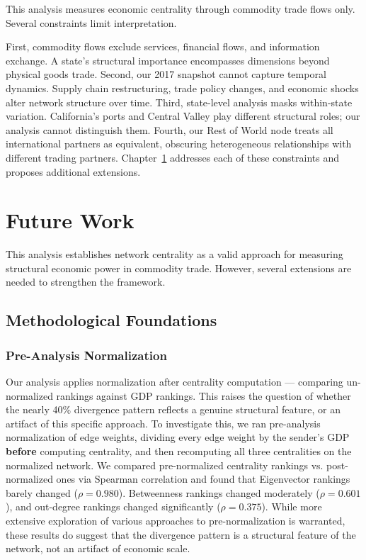 \documentclass[12pt,oneside]{book}
\begin{document}
This analysis measures economic centrality through commodity trade flows only. Several constraints limit interpretation.

First, commodity flows exclude services, financial flows, and information exchange. A state's structural importance encompasses dimensions beyond physical goods trade. Second, our 2017 snapshot cannot capture temporal dynamics. Supply chain restructuring, trade policy changes, and economic shocks alter network structure over time. Third, state-level analysis masks within-state variation. California's ports and Central Valley play different structural roles; our analysis cannot distinguish them. Fourth, our Rest of World node treats all international partners as equivalent, obscuring heterogeneous relationships with different trading partners. Chapter~\ref{sec:future_work} addresses each of these constraints and proposes additional extensions.


\FloatBarrier
\chapter{Future Work}
\label{sec:future_work}

This analysis establishes network centrality as a valid approach for measuring structural economic power in commodity trade. However, several extensions are needed to strengthen the framework.

\section{Methodological Foundations}
\subsection{Pre-Analysis Normalization}

Our analysis applies normalization after centrality computation --- comparing un-normalized rankings against GDP rankings. This raises the question of whether the nearly 40\% divergence pattern reflects a genuine structural feature, or an artifact of this specific approach. To investigate this, we ran pre-analysis normalization of edge weights, dividing every edge weight by the sender's GDP \textbf{before} computing centrality, and then recomputing all three centralities on the normalized network. We compared pre-normalized centrality rankings vs. post-normalized ones via Spearman correlation and found that Eigenvector rankings barely changed ($\rho = 0.980$). Betweenness rankings changed moderately ($\rho = 0.601$), and out-degree rankings changed significantly ($\rho = 0.375$). While more extensive exploration of various approaches to pre-normalization is warranted, these results do suggest that the divergence pattern is a structural feature of the network, not an artifact of economic scale.  
\end{document}
